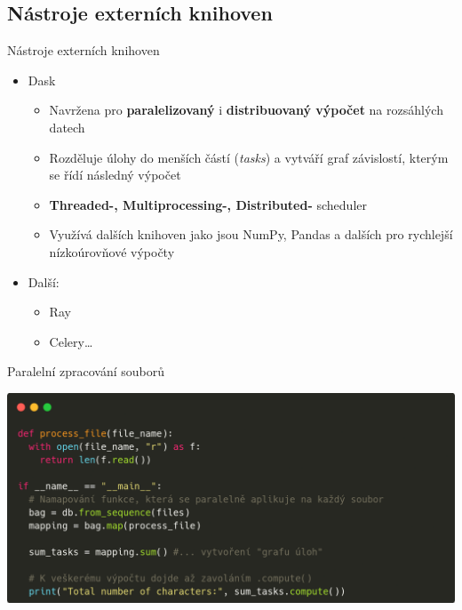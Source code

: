 \documentclass{beamer}
\begin{document}
\subsection{Nástroje externích knihoven}
\begin{frame}{Nástroje externích knihoven}
	\begin{itemize}
    \item Dask
      \begin{itemize}
        \item [\textendash] Navržena pro \textbf{paralelizovaný} i \textbf{distribuovaný výpočet} na rozsáhlých datech

        \item [\textendash] Rozděluje úlohy do menších částí (\textit{tasks}) a vytváří graf závislostí, kterým se řídí následný výpočet

        \item [\textendash] \textbf{Threaded-, Multiprocessing-, Distributed-} scheduler

        \item [\textendash] Využívá dalších knihoven jako jsou NumPy, Pandas a dalších pro rychlejší nízkoúrovňové výpočty
      \end{itemize}
    \item Další:
      \begin{itemize}
        \item [\textendash] Ray
        \item [\textendash] Celery\dots
      \end{itemize}
  \end{itemize}
\end{frame}

\begin{frame}{Paralelní zpracování souborů}



    \begin{center}
        \includegraphics[width=\textwidth]{obrazky/codes/carbon15.png}
    \end{center}
\end{frame}
\end{document}
